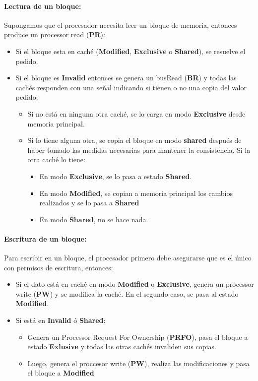 \paragraph{Lectura de un bloque:}
Supongamos que el procesador necesita leer un bloque de memoria, entonces produce un processor read (\textbf{PR}):
\begin{itemize}
	\item Si el bloque esta en caché (\textbf{Modified}, \textbf{Exclusive} o \textbf{Shared}), se resuelve el pedido.
	\item Si el bloque es \textbf{Invalid} entonces se genera un busRead (\textbf{BR}) y todas las cachés responden con una señal indicando si tienen o no una copia del valor pedido:
	\begin{itemize}
		\item Si no está en ninguna otra caché, se lo carga en modo \textbf{Exclusive} desde memoria principal.
		\item Si lo tiene alguna otra, se copia el bloque en modo \textbf{shared} después de haber tomado las medidas necesarias para mantener la consistencia. Si la otra caché lo tiene:
		\begin{itemize}
			\item En modo \textbf{Exclusive}, se lo pasa a estado \textbf{Shared}.
			\item En modo \textbf{Modified}, se copian a memoria principal los cambios realizados y se lo pasa a \textbf{Shared}
			\item En modo \textbf{Shared}, no se hace nada.
		\end{itemize}
	\end{itemize}
\end{itemize}

\paragraph{Escritura de un bloque:} Para escribir en un bloque, el procesador primero debe asegurarse que es el único con permisos de escritura, entonces:

\begin{itemize}
	\item Si el dato está en caché en modo \textbf{Modified} o \textbf{Exclusive}, genera un processor write (\textbf{PW}) y se modifica la caché. En el segundo caso, se pasa al estado \textbf{Modified}.
	\item Si está en \textbf{Invalid} ó \textbf{Shared}:
	\begin{itemize}
		\item Genera un Processor Request For Ownership (\textbf{PRFO}), pasa el bloque a estado \textbf{Exlusive} y todas las otras cachés invaliden sus copias.
		\item Luego, genera el proccesor write (\textbf{PW}), realiza las modificaciones y pasa el bloque a \textbf{Modified}
	\end{itemize}
\end{itemize}